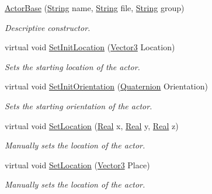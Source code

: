 \begin{DoxyCompactItemize}
\hyperlink{classphys_1_1ActorBase_ae807b3c297a038572bdbfe975754c2e5}{ActorBase} (\hyperlink{namespacephys_aa03900411993de7fbfec4789bc1d392e}{String} name, \hyperlink{namespacephys_aa03900411993de7fbfec4789bc1d392e}{String} file, \hyperlink{namespacephys_aa03900411993de7fbfec4789bc1d392e}{String} group)
\begin{DoxyCompactList}\small\item\em Descriptive constructor. \item\end{DoxyCompactList}\item 
virtual void \hyperlink{classphys_1_1ActorBase_a0ff0980bcf33a8205eb058b8caa1f36b}{SetInitLocation} (\hyperlink{classphys_1_1Vector3}{Vector3} Location)
\begin{DoxyCompactList}\small\item\em Sets the starting location of the actor. \item\end{DoxyCompactList}\item 
virtual void \hyperlink{classphys_1_1ActorBase_a681186465db767954ca3f9530a1d7c36}{SetInitOrientation} (\hyperlink{classphys_1_1Quaternion}{Quaternion} Orientation)
\begin{DoxyCompactList}\small\item\em Sets the starting orientation of the actor. \item\end{DoxyCompactList}\item 
virtual void \hyperlink{classphys_1_1ActorBase_a0b0db2ec0f4926326635b86f1ead2276}{SetLocation} (\hyperlink{namespacephys_af7eb897198d265b8e868f45240230d5f}{Real} x, \hyperlink{namespacephys_af7eb897198d265b8e868f45240230d5f}{Real} y, \hyperlink{namespacephys_af7eb897198d265b8e868f45240230d5f}{Real} z)
\begin{DoxyCompactList}\small\item\em Manually sets the location of the actor. \item\end{DoxyCompactList}\item 
virtual void \hyperlink{classphys_1_1ActorBase_a3212be459859a67bf7ae64919d58d5a5}{SetLocation} (\hyperlink{classphys_1_1Vector3}{Vector3} Place)
\begin{DoxyCompactList}\small\item\em Manually sets the location of the actor. \item\end{DoxyCompactList}\item 

\end{DoxyCompactItemize}
